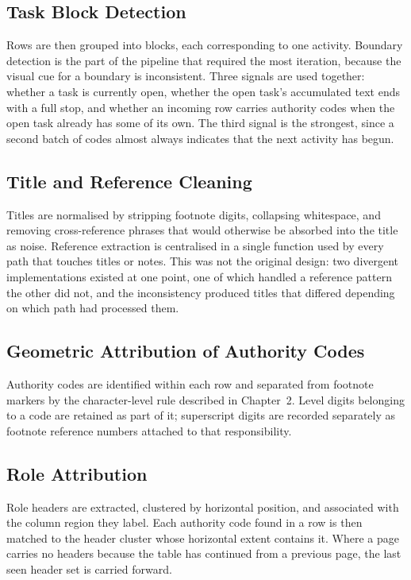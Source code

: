 \subsection{Task Block Detection}

Rows are then grouped into blocks, each corresponding to one activity. Boundary detection is the part of the pipeline that required the most iteration, because the visual cue for a boundary is inconsistent. Three signals are used together: whether a task is currently open, whether the open task's accumulated text ends with a full stop, and whether an incoming row carries authority codes when the open task already has some of its own. The third signal is the strongest, since a second batch of codes almost always indicates that the next activity has begun.

\subsection{Title and Reference Cleaning}

Titles are normalised by stripping footnote digits, collapsing whitespace, and removing cross-reference phrases that would otherwise be absorbed into the title as noise. Reference extraction is centralised in a single function used by every path that touches titles or notes. This was not the original design: two divergent implementations existed at one point, one of which handled a reference pattern the other did not, and the inconsistency produced titles that differed depending on which path had processed them.

\subsection{Geometric Attribution of Authority Codes}

Authority codes are identified within each row and separated from footnote markers by the character-level rule described in Chapter~2. Level digits belonging to a code are retained as part of it; superscript digits are recorded separately as footnote reference numbers attached to that responsibility.

\subsection{Role Attribution}

Role headers are extracted, clustered by horizontal position, and associated with the column region they label. Each authority code found in a row is then matched to the header cluster whose horizontal extent contains it. Where a page carries no headers because the table has continued from a previous page, the last seen header set is carried forward.

